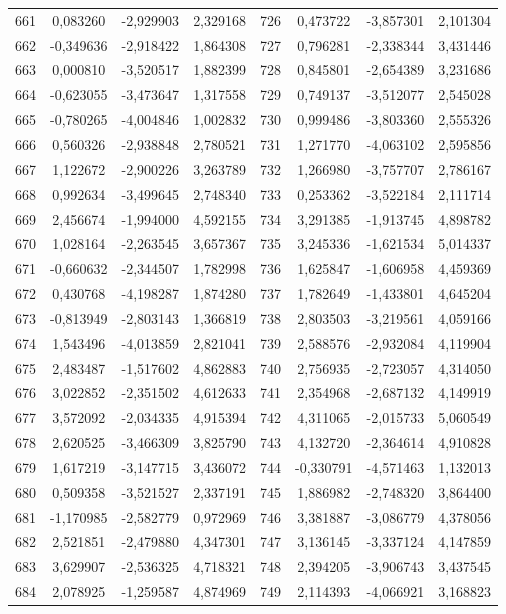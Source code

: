 \begin{apendicesenv}
\begin{table}[H]
\begin{tabular}{c c c c c c c c}
		661 & 0,083260 & -2,929903 & 2,329168 & 726 & 0,473722 & -3,857301 & 2,101304 \\
		662 & -0,349636 & -2,918422 & 1,864308 & 727 & 0,796281 & -2,338344 & 3,431446 \\
		663 & 0,000810 & -3,520517 & 1,882399 & 728 & 0,845801 & -2,654389 & 3,231686 \\
		664 & -0,623055 & -3,473647 & 1,317558 & 729 & 0,749137 & -3,512077 & 2,545028 \\
		665 & -0,780265 & -4,004846 & 1,002832 & 730 & 0,999486 & -3,803360 & 2,555326 \\
		666 & 0,560326 & -2,938848 & 2,780521 & 731 & 1,271770 & -4,063102 & 2,595856 \\
		667 & 1,122672 & -2,900226 & 3,263789 & 732 & 1,266980 & -3,757707 & 2,786167 \\
		668 & 0,992634 & -3,499645 & 2,748340 & 733 & 0,253362 & -3,522184 & 2,111714 \\
		669 & 2,456674 & -1,994000 & 4,592155 & 734 & 3,291385 & -1,913745 & 4,898782 \\
		670 & 1,028164 & -2,263545 & 3,657367 & 735 & 3,245336 & -1,621534 & 5,014337 \\
		671 & -0,660632 & -2,344507 & 1,782998 & 736 & 1,625847 & -1,606958 & 4,459369 \\
		672 & 0,430768 & -4,198287 & 1,874280 & 737 & 1,782649 & -1,433801 & 4,645204 \\
		673 & -0,813949 & -2,803143 & 1,366819 & 738 & 2,803503 & -3,219561 & 4,059166 \\
		674 & 1,543496 & -4,013859 & 2,821041 & 739 & 2,588576 & -2,932084 & 4,119904 \\
		675 & 2,483487 & -1,517602 & 4,862883 & 740 & 2,756935 & -2,723057 & 4,314050 \\
		676 & 3,022852 & -2,351502 & 4,612633 & 741 & 2,354968 & -2,687132 & 4,149919 \\
		677 & 3,572092 & -2,034335 & 4,915394 & 742 & 4,311065 & -2,015733 & 5,060549 \\
		678 & 2,620525 & -3,466309 & 3,825790 & 743 & 4,132720 & -2,364614 & 4,910828 \\
		679 & 1,617219 & -3,147715 & 3,436072 & 744 & -0,330791 & -4,571463 & 1,132013 \\
		680 & 0,509358 & -3,521527 & 2,337191 & 745 & 1,886982 & -2,748320 & 3,864400 \\
		681 & -1,170985 & -2,582779 & 0,972969 & 746 & 3,381887 & -3,086779 & 4,378056 \\
		682 & 2,521851 & -2,479880 & 4,347301 & 747 & 3,136145 & -3,337124 & 4,147859 \\
		683 & 3,629907 & -2,536325 & 4,718321 & 748 & 2,394205 & -3,906743 & 3,437545 \\
		684 & 2,078925 & -1,259587 & 4,874969 & 749 & 2,114393 & -4,066921 & 3,168823 \\
		\bottomrule
	\end{tabular}
\end{table}


\end{apendicesenv}
